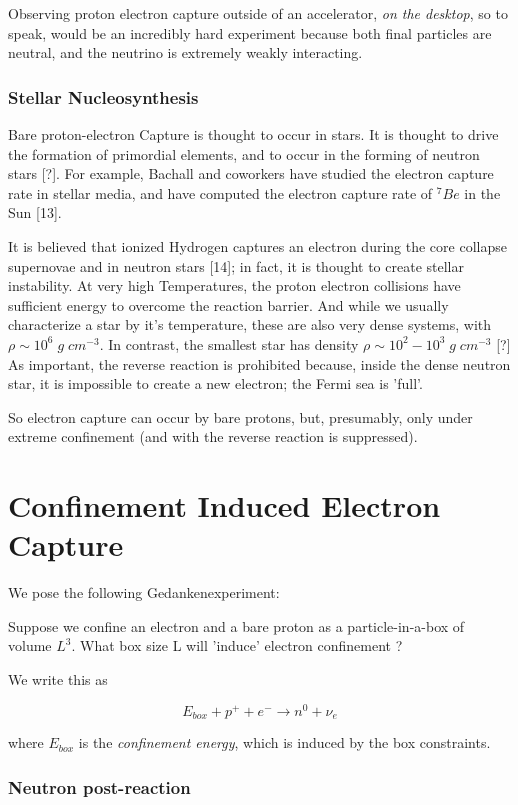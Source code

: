 \documentclass[11pt]{amsart}
\begin{document}
Observing proton electron capture outside of an accelerator, \emph{on the desktop}, so to speak, would be an incredibly hard experiment because both final particles are neutral, and  the neutrino is extremely weakly interacting.

\subsubsection{Stellar Nucleosynthesis}

Bare proton-electron Capture is thought to occur in stars.  It is thought to drive the formation of primordial elements, and to occur in the forming of neutron stars [?].  For example, Bachall and coworkers have studied the electron capture rate in stellar media, and have computed the electron capture rate of $^{7}Be$ in the Sun [13].

 It is believed that ionized Hydrogen captures an electron during the core collapse supernovae and in neutron stars [14]; in fact, it is thought to create stellar instability.  At very high Temperatures, the proton electron collisions have sufficient energy to overcome the reaction barrier.  And while we usually characterize a star by it's temperature, these are also very dense systems, with $\rho\sim 10^6\;g\;cm^{-3}$.  In contrast, the smallest star has density $\rho\sim 10^{2}-10^{3}\;g\;cm^{-3}$ [?]  As important, the reverse reaction is prohibited because, inside the dense neutron star, it is impossible to create a new electron; the Fermi sea is 'full'.

So electron capture can occur by bare protons, but, presumably, only under extreme confinement (and with the reverse reaction is suppressed).

\section{Confinement Induced Electron Capture}

We pose the following Gedankenexperiment:  

Suppose we confine an electron and a bare proton as a particle-in-a-box of volume $L^3$.  What box size L will 'induce' electron confinement ?

We write this as

$$E_{box}+p^{+}+e^{-}\rightarrow n^{0}+\nu_{e}$$

where $E_{box}$ is the \emph{confinement energy}, which is induced by the box constraints. 

\subsubsection{Neutron post-reaction}
\end{document}

